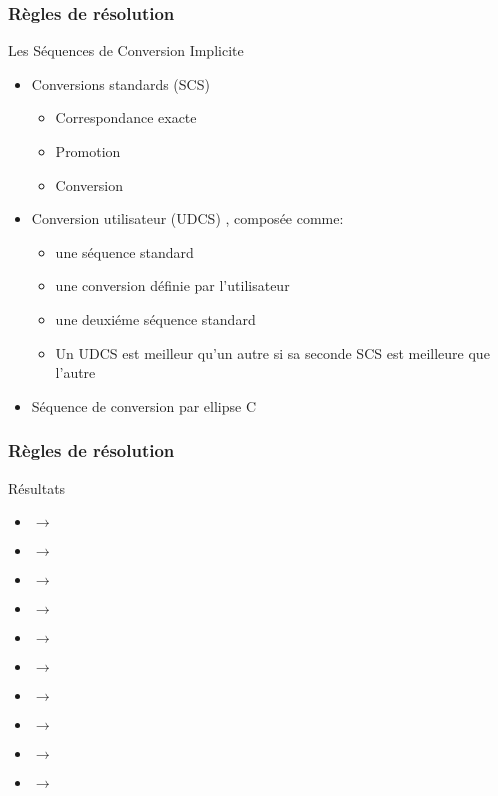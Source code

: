 \documentclass[svgnames]{beamer}
\begin{document}
\begin{frame}
\frametitle{Règles de résolution}
\begin{block}{Les Séquences de Conversion Implicite}
\begin{itemize}\footnotesize
\item Conversions standards (SCS)
\begin{itemize}
\footnotesize
\item Correspondance exacte
\item Promotion
\item Conversion
\end{itemize}
\item Conversion utilisateur (UDCS) , composée comme:
\begin{itemize}
\footnotesize
\item une séquence standard
\item une conversion définie par l'utilisateur
\item une deuxiéme séquence standard
\item Un UDCS est meilleur qu'un autre si sa seconde SCS est meilleure que l'autre
\end{itemize}

\item Séquence de conversion par ellipse C
\end{itemize}
\end{block}
\end{frame}

\begin{frame}
\frametitle{Règles de résolution}

\begin{block}{Résultats}
{
\begin{itemize}
\footnotesize
\item {} $\rightarrow$ 
\item {} $\rightarrow$ 
\item {} $\rightarrow$ 
\item {} $\rightarrow$  
\item {} $\rightarrow$ 
\end{itemize}
}
{
\begin{itemize}
\footnotesize
\item {} $\rightarrow$ 
\item {} $\rightarrow$ 
\item {} $\rightarrow$ 
\item {} $\rightarrow$  
\item {} $\rightarrow$ 
\end{itemize}
}
\end{block}
\end{frame}
\end{document}
